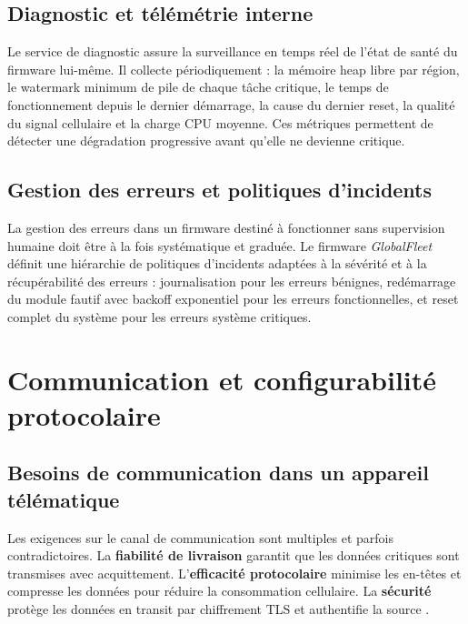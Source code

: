 \subsection{Diagnostic et télémétrie interne}
\label{subsec:diag}

Le service de diagnostic assure la surveillance en temps réel de
l'état de santé du firmware lui-même. Il collecte périodiquement :
la mémoire heap libre par région, le watermark minimum de pile de
chaque tâche critique, le temps de fonctionnement depuis le dernier
démarrage, la cause du dernier reset, la qualité du signal cellulaire
et la charge CPU moyenne. Ces métriques permettent de détecter une
dégradation progressive avant qu'elle ne devienne critique.

\subsection{Gestion des erreurs et politiques d'incidents}
\label{subsec:erreurs}

La gestion des erreurs dans un firmware destiné à fonctionner sans
supervision humaine doit être à la fois systématique et graduée.
Le firmware \textit{GlobalFleet} définit une hiérarchie de politiques
d'incidents adaptées à la sévérité et à la récupérabilité des erreurs :
journalisation pour les erreurs bénignes, redémarrage du module fautif
avec backoff exponentiel pour les erreurs fonctionnelles, et reset
complet du système pour les erreurs système critiques.

\section{Communication et configurabilité protocolaire}
\label{sec:comms}

\subsection{Besoins de communication dans un appareil télématique}
\label{subsec:besoin_comms}

Les exigences sur le canal de communication sont multiples et parfois
contradictoires. La \textbf{fiabilité de livraison} garantit que les
données critiques sont transmises avec acquittement. L'\textbf{efficacité
protocolaire} minimise les en-têtes et compresse les données pour
réduire la consommation cellulaire. La \textbf{sécurité} protège
les données en transit par chiffrement TLS et authentifie la source
\cite{tls_rfc5246}.


